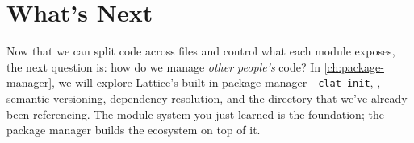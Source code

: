 \section*{What's Next}

Now that we can split code across files and control what each module exposes, the next question is: how do we manage \emph{other people's} code?
In \cref{ch:package-manager}, we will explore Lattice's built-in package manager---\texttt{clat init}, , semantic versioning, dependency resolution, and the  directory that we've already been referencing.
The module system you just learned is the foundation; the package manager builds the ecosystem on top of it.
